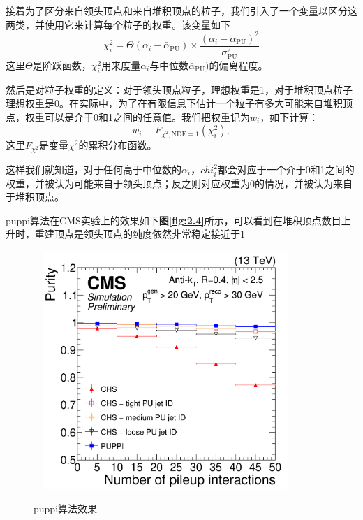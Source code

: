 接着为了区分来自领头顶点和来自堆积顶点的粒子，我们引入了一个变量以区分这两类，并使用它来计算每个粒子的权重。该变量如下
\begin{equation}\label{eq:chi2}
    \chi_{i}^{2}=\Theta(\alpha_{i}-\bar{\alpha}_{\text{PU}})\times\frac{(\alpha_{i}-\bar{\alpha}_{\text{PU}})^{2}}{\sigma_{\text{PU}}^{2}}
\end{equation}
这里$\Theta$是阶跃函数，$\chi^2_i$用来度量$\alpha_i$与中位数$\bar{\alpha}_{\text{PU}})$的偏离程度。

然后是对粒子权重的定义：对于领头顶点粒子，理想权重是1，对于堆积顶点粒子理想权重是0。在实际中，为了在有限信息下估计一个粒子有多大可能来自堆积顶点，权重可以是介于0和1之间的任意值。我们把权重记为$w_i$，如下计算：
\begin{equation}\label{eq:weight}
    w_{i}\equiv F_{\chi^{2},\text{NDF}=1}(\chi_{i}^{2}),
\end{equation}
这里$F_{\chi^2}$是变量$\chi^2$的累积分布函数。

这样我们就知道，对于任何高于中位数的$\alpha_i$，$chi^2_i$都会对应于一个介于0和1之间的权重，并被认为可能来自于领头顶点；反之则对应权重为0的情况，并被认为来自于堆积顶点。

puppi算法在CMS实验上的效果如下\textbf{图\ref{fig:2.4}}所示，可以看到在堆积顶点数目上升时，重建顶点是领头顶点的纯度依然非常稳定接近于1
\begin{figure}[H]
 \centering
 \caption{puppi算法效果\cite{pileup-performance}}
 \includegraphics[height=9cm, width=10cm]{pictures/puppi_performance.png}
 \label{fig:3.4}
\end{figure}

